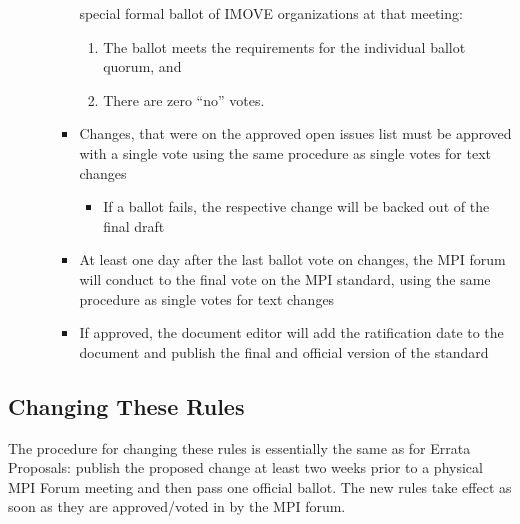 \begin{enumerate}
\begin{enumerate}
\begin{itemize}
    special formal ballot of IMOVE organizations at that meeting:
    \begin{enumerate}
    \item The ballot meets the requirements for the individual
      ballot quorum, and
    \item There are zero ``no'' votes.
    \end{enumerate}
\item Changes, that were on the approved open issues list must be approved with a single vote using the same procedure as single votes for text changes
\begin{itemize}
\item If a ballot fails, the respective change will be backed out of the final draft
\end{itemize}
\item At least one day after the last ballot vote on changes, the MPI forum will conduct to the final vote on the MPI standard, using the same procedure as single votes for text changes
\item If approved, the document editor will add the ratification date to the document and publish the final and official version of the standard
\end{itemize}

\end{enumerate}
 
\end{enumerate}


\subsection{Changing These Rules}

The procedure for changing these rules is essentially the same as for
Errata Proposals: publish the proposed change at least two weeks prior
to a physical MPI Forum meeting and then pass one official ballot. The
new rules take effect as soon as they are approved/voted in by the
MPI forum.


